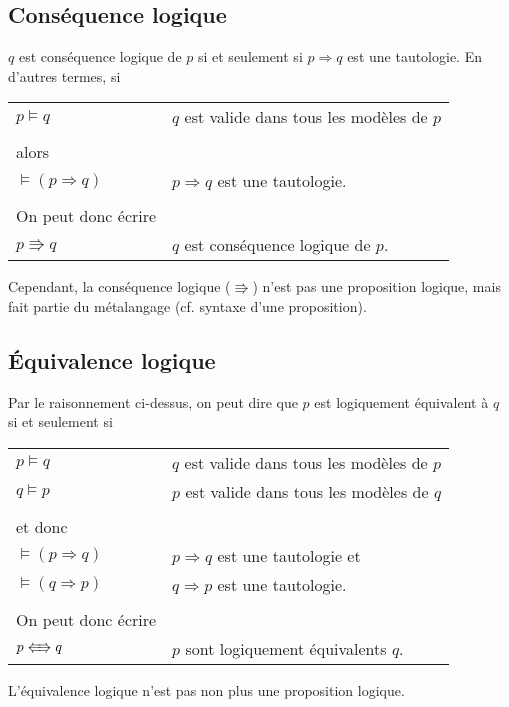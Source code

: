 		\subsection{Conséquence logique}
			$q$ est conséquence logique de $p$ si et seulement si $p \Rightarrow q$ est une tautologie. En d'autres termes, si
			\begin{center}
			\begin{tabular}{ll}
			$p \models q$ & $q$ est valide dans tous les modèles de $p$ \\
			&\\
			alors & \\
			$\models (p \Rightarrow q)$ & $p \Rightarrow q$ est une tautologie.\\
			&\\
			On peut donc écrire & \\
			$p \Rrightarrow q$ & $q$ est conséquence logique de $p$.\\
			\end{tabular}
			\end{center}
			Cependant, la conséquence logique ($\Rrightarrow$) n'est pas une proposition logique, mais fait partie du métalangage (cf. syntaxe d'une proposition).
		
		\subsection{Équivalence logique}
			Par le raisonnement ci-dessus, on peut dire que $p$ est logiquement équivalent à $q$ si et seulement si
			\begin{center}
			\begin{tabular}{ll}
			$p \models q$ & $q$ est valide dans tous les modèles de $p$ \\
			$q \models p$ & $p$ est valide dans tous les modèles de $q$ \\
			&\\
			et donc & \\
			$\models (p \Rightarrow q)$ & $p \Rightarrow q$ est une tautologie et\\
			$\models (q \Rightarrow p)$ & $q \Rightarrow p$ est une tautologie.\\
			&\\
			On peut donc écrire & \\
			$p \LRarrow q$ & $p$ sont logiquement équivalents $q$.\\
			\end{tabular}
			\end{center}
			L'équivalence logique n'est pas non plus une proposition logique.\\
			
